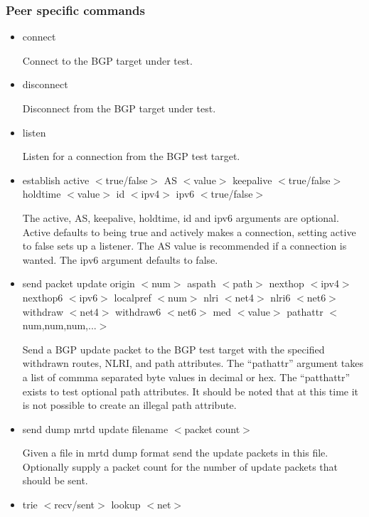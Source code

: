 \documentclass[11pt]{article}
\begin{document}
\subsubsection{Peer specific commands}

\begin{itemize}

\item connect

  Connect to the BGP target under test.

\item disconnect

  Disconnect from the BGP target under test.

\item listen 

  Listen for a connection from the BGP test target.

\item {\sf establish
  active $<$true/false$>$
  AS $<$value$>$
  keepalive $<$true/false$>$
  holdtime $<$value$>$ 
  id $<$ipv4$>$}
  ipv6 $<$true/false$>$

  The active, AS, keepalive, holdtime, id and ipv6 arguments are
  optional. Active defaults to being true and actively makes a
  connection, setting active to false sets up a listener. The AS value
  is recommended if a connection is wanted. The ipv6 argument defaults
  to false.

\item {\sf send packet update 
  origin $<$num$>$ 
  aspath $<$path$>$ 
  nexthop $<$ipv4$>$ 
  nexthop6 $<$ipv6$>$ 
  localpref $<$num$>$
  nlri $<$net4$>$
  nlri6 $<$net6$>$
  withdraw $<$net4$>$
  withdraw6 $<$net6$>$
  med $<$value$>$
  pathattr $<$num,num,num,...$>$}

  Send a BGP update packet to the BGP test target with the specified
  withdrawn routes, NLRI, and path attributes. The ``pathattr''
  argument takes a list of commma separated byte values in decimal or
  hex. The ``patthattr'' exists to test optional path attributes. It
  should be noted that at this time it is not possible to create an
  illegal path attribute.

\item {\sf send dump mrtd update filename $<$packet count$>$}
  
  Given a file in mrtd dump format send the update packets in this
  file. Optionally supply a packet count for the number of update
  packets that should be sent.

\item {\sf trie $<$recv/sent$>$ lookup $<$net$>$}


\end{itemize}
\end{document}

